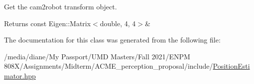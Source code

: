Get the cam2robot transform object. 

\begin{DoxyReturn}{Returns}
const Eigen\+::\+Matrix$<$double, 4, 4$>$\& 
\end{DoxyReturn}


The documentation for this class was generated from the following file\+:\begin{DoxyCompactItemize}
\item 
/media/diane/\+My Passport/\+U\+M\+D Masters/\+Fall 2021/\+E\+N\+P\+M 808\+X/\+Assignments/\+Midterm/\+A\+C\+M\+E\+\_\+perception\+\_\+proposal/include/\hyperlink{_position_estimator_8hpp}{Position\+Estimator.\+hpp}\end{DoxyCompactItemize}
